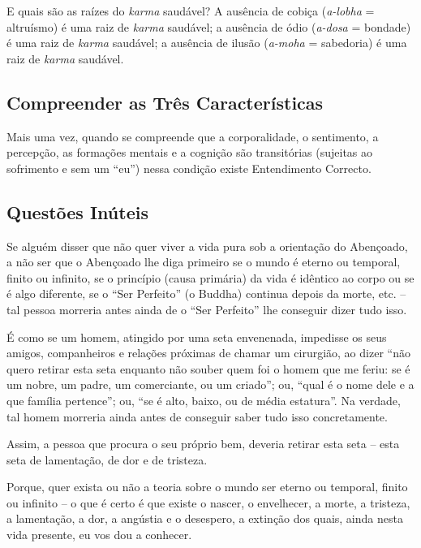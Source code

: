 E quais são as raízes do \emph{karma} saudável? A ausência de cobiça
(\emph{a-lobha} = altruísmo) é uma raiz de \emph{karma} saudável; a ausência de
ódio (\emph{a-dosa} = bondade) é uma raiz de \emph{karma} saudável; a ausência
de ilusão (\emph{a-moha} = sabedoria) é uma raiz de \emph{karma} saudável.


\subsection{Compreender as Três Características}


Mais uma vez, quando se compreende que a corporalidade, o sentimento, a
percepção, as formações mentais e a cognição são transitórias (sujeitas ao
sofrimento e sem um “eu”) nessa condição existe Entendimento Correcto.


\subsection{Questões Inúteis}

Se alguém disser que não quer viver a vida pura sob a orientação do Abençoado, a
não ser que o Abençoado lhe diga primeiro se o mundo é eterno ou temporal,
finito ou infinito, se o princípio (causa primária) da vida é idêntico ao corpo
ou se é algo diferente, se o “Ser Perfeito” (o Buddha) continua depois da
morte, etc. -- tal pessoa morreria antes ainda de o “Ser Perfeito” lhe
conseguir dizer tudo isso.

É como se um homem, atingido por uma seta envenenada, impedisse os seus amigos,
companheiros e relações próximas de chamar um cirurgião, ao dizer “não quero
retirar esta seta enquanto não souber quem foi o homem que me feriu: se é um
nobre, um padre, um comerciante, ou um criado”; ou, “qual é o nome dele e a
que família pertence”; ou, “se é alto, baixo, ou de média estatura”. Na
verdade, tal homem morreria ainda antes de conseguir saber tudo isso
concretamente.


Assim, a pessoa que procura o seu próprio bem, deveria retirar esta seta -- esta
seta de lamentação, de dor e de tristeza.


Porque, quer exista ou não a teoria sobre o mundo ser eterno ou temporal, finito
ou infinito -- o que é certo é que existe o nascer, o envelhecer, a morte, a
tristeza, a lamentação, a dor, a angústia e o desespero, a extinção dos quais,
ainda nesta vida presente, eu vos dou a conhecer.

